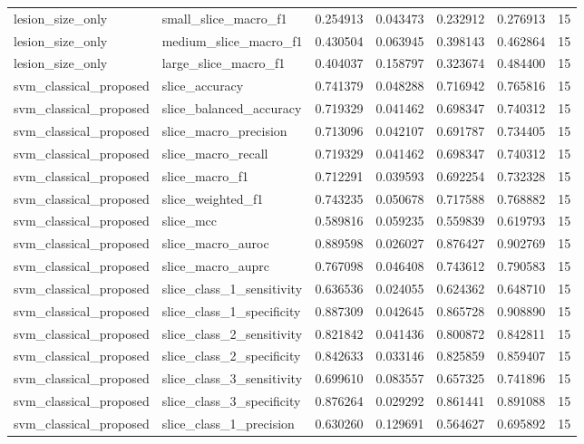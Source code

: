 \begin{tabular}{llrrrrr}
lesion_size_only & small_slice_macro_f1 & 0.254913 & 0.043473 & 0.232912 & 0.276913 & 15 \\
lesion_size_only & medium_slice_macro_f1 & 0.430504 & 0.063945 & 0.398143 & 0.462864 & 15 \\
lesion_size_only & large_slice_macro_f1 & 0.404037 & 0.158797 & 0.323674 & 0.484400 & 15 \\
svm_classical_proposed & slice_accuracy & 0.741379 & 0.048288 & 0.716942 & 0.765816 & 15 \\
svm_classical_proposed & slice_balanced_accuracy & 0.719329 & 0.041462 & 0.698347 & 0.740312 & 15 \\
svm_classical_proposed & slice_macro_precision & 0.713096 & 0.042107 & 0.691787 & 0.734405 & 15 \\
svm_classical_proposed & slice_macro_recall & 0.719329 & 0.041462 & 0.698347 & 0.740312 & 15 \\
svm_classical_proposed & slice_macro_f1 & 0.712291 & 0.039593 & 0.692254 & 0.732328 & 15 \\
svm_classical_proposed & slice_weighted_f1 & 0.743235 & 0.050678 & 0.717588 & 0.768882 & 15 \\
svm_classical_proposed & slice_mcc & 0.589816 & 0.059235 & 0.559839 & 0.619793 & 15 \\
svm_classical_proposed & slice_macro_auroc & 0.889598 & 0.026027 & 0.876427 & 0.902769 & 15 \\
svm_classical_proposed & slice_macro_auprc & 0.767098 & 0.046408 & 0.743612 & 0.790583 & 15 \\
svm_classical_proposed & slice_class_1_sensitivity & 0.636536 & 0.024055 & 0.624362 & 0.648710 & 15 \\
svm_classical_proposed & slice_class_1_specificity & 0.887309 & 0.042645 & 0.865728 & 0.908890 & 15 \\
svm_classical_proposed & slice_class_2_sensitivity & 0.821842 & 0.041436 & 0.800872 & 0.842811 & 15 \\
svm_classical_proposed & slice_class_2_specificity & 0.842633 & 0.033146 & 0.825859 & 0.859407 & 15 \\
svm_classical_proposed & slice_class_3_sensitivity & 0.699610 & 0.083557 & 0.657325 & 0.741896 & 15 \\
svm_classical_proposed & slice_class_3_specificity & 0.876264 & 0.029292 & 0.861441 & 0.891088 & 15 \\
svm_classical_proposed & slice_class_1_precision & 0.630260 & 0.129691 & 0.564627 & 0.695892 & 15 \\

\end{tabular}
